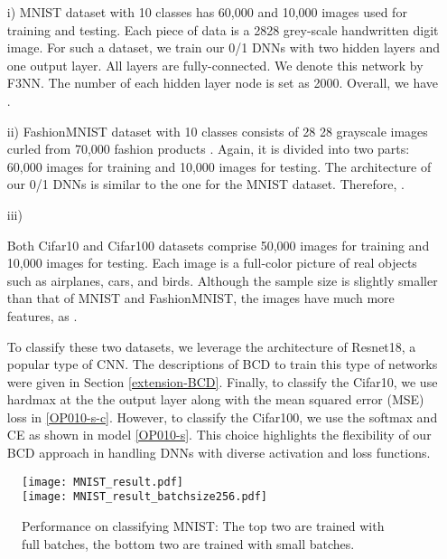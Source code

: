 \documentclass[journal]{IEEEtran}
\begin{document}
\begin{itemize}[leftmargin=15pt]
\item[i)] MNIST dataset with 10 classes has 60,000 and 10,000 images used for training and testing. Each piece of data is a 2828 grey-scale handwritten digit image. For such a dataset, we train our 0/1 DNNs with two hidden layers and one  output layer. {All layers are fully-connected. We denote this network by F3NN.} The number of each hidden layer node is set as 2000. Overall, we have .

\item[ii)] FashionMNIST dataset with 10 classes consists of 28  28 grayscale images curled from 70,000 fashion products \cite{Xiao2017}. Again, it is divided into two parts: 60,000 images for training and 10,000 images for testing. The architecture of our 0/1 DNNs is similar to the one for the MNIST dataset. Therefore,  .

\item[iii)] { Both Cifar10  and Cifar100 datasets comprise 50,000 images for training and 10,000 images for testing. Each image is a full-color  picture of real objects such as airplanes, cars, and birds. Although the sample size is slightly smaller than that of MNIST and FashionMNIST,  the images have much more features, as .

To classify these two datasets, we leverage the architecture of Resnet18, a popular type of CNN.  The descriptions of BCD to train this type of networks were given in Section \ref{extension-BCD}.  Finally, to classify the Cifar10, we use hardmax at the the output layer along with the mean squared error (MSE) loss in \eqref{OP010-s-c}. However, to classify the Cifar100, we use the softmax and CE as shown in model \eqref{OP010-s}. This choice highlights the flexibility of our BCD approach in handling DNNs with diverse activation and loss functions.}
\end{itemize}
\begin{figure*}[!th]
\centering
\texttt{[image: MNIST\_result.pdf]}\\  \vspace{1mm}
\texttt{[image: MNIST\_result\_batchsize256.pdf]}\\  
\caption{Performance on classifying MNIST: The top two are trained with full batches, the bottom two are trained with small batches.}
\label{fig:MNIST} 
\end{figure*}


 
\end{document}
